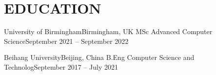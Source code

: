 \section{EDUCATION}


\begin{CVentries}
  \CVentry
  \CVhead
  {University of Birmingham}{Birmingham, UK}
  {MSc Advanced Computer Science}{September 2021 -- September 2022}

  \CVhead
  {Beihang University}{Beijing, China}
  {B.Eng Computer Science and Technolog}{September 2017 -- July 2021}
\end{CVentries}
